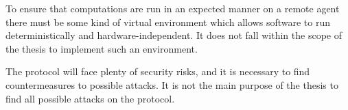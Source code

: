 To ensure that computations are run in an expected manner on a remote agent there must be some kind of virtual environment which allows software to run deterministically and hardware-independent. It does not fall within the scope of the thesis to implement such an environment.

The protocol will face plenty of security risks, and it is necessary to find countermeasures to possible attacks. It is not the main purpose of the thesis to find all possible attacks on the protocol.
